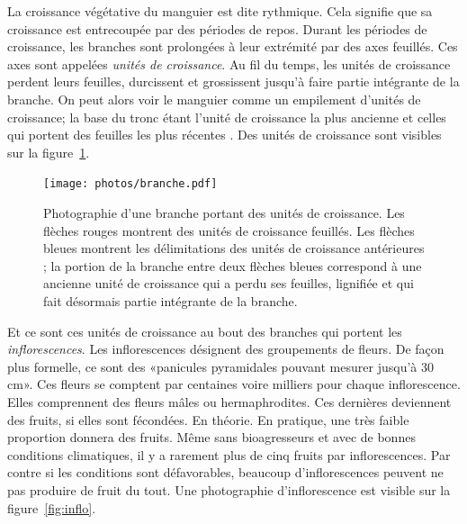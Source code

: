 La croissance végétative du manguier est dite rythmique.
Cela signifie que sa croissance est entrecoupée par des périodes de repos.
Durant les périodes de croissance, les branches sont prolongées à leur extrémité par des axes feuillés.
Ces axes sont appelées \emph{unités de croissance}. 
Au fil du temps, les unités de croissance perdent leurs feuilles, durcissent et grossissent jusqu'à faire partie intégrante de la branche.
On peut alors voir le manguier comme un empilement d'unités de croissance;
la base du tronc étant l'unité de croissance la plus ancienne et celles qui portent des feuilles les plus récentes \citep{normand2009}.
Des unités de croissance sont visibles sur la figure~\ref{fig:uc}.
\begin{figure}[ht]
 \centering
 \texttt{[image: photos/branche.pdf]}
 \caption{Photographie d'une branche portant des unités de croissance. Les flèches rouges montrent des unités de croissance feuillés. Les flèches bleues montrent les délimitations des unités de croissance antérieures ; la portion de la branche entre deux flèches bleues correspond à une ancienne unité de croissance qui a perdu ses feuilles, lignifiée et qui fait désormais partie intégrante de la branche.}
 \label{fig:uc}
\end{figure}


\newpage

Et ce sont ces unités de croissance au bout des branches qui portent les \emph{inflorescences}.
Les inflorescences désignent des groupements de fleurs. De façon plus formelle, ce sont des «panicules pyramidales pouvant mesurer jusqu’à 30 cm».
Ces fleurs se comptent par centaines voire milliers pour chaque inflorescence. 
Elles comprennent des fleurs mâles ou hermaphrodites.
Ces dernières deviennent des fruits, si elles sont fécondées.
En théorie.
En pratique, une très faible proportion donnera des fruits.
Même sans bioagresseurs et avec de bonnes conditions climatiques, il y a rarement plus de cinq fruits par inflorescences.
Par contre si les conditions sont défavorables, beaucoup d'inflorescences peuvent ne pas produire de fruit du tout.
Une photographie d'inflorescence est visible sur la figure~\ref{fig:inflo}.

